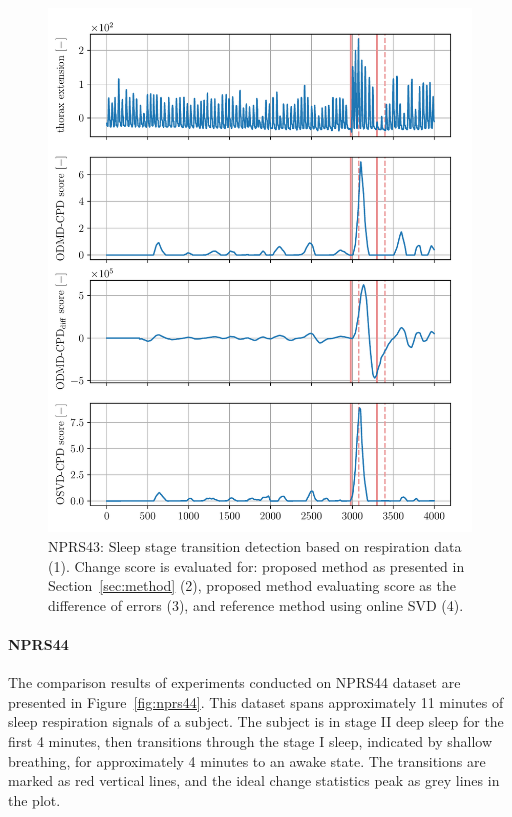 \begin{figure}
    \centering
    \includegraphics[width=\linewidth]{figures/nprs43-chd_r2-roll_301-dmd_w1.0-h80.pdf}
    \caption{NPRS43: Sleep stage transition detection based on respiration data (1). Change score is evaluated for: proposed method as presented in Section~\ref{sec:method} (2), proposed method evaluating score as the difference of errors (3), and reference method using online SVD (4).}\label{fig:nprs43}
\end{figure}

\paragraph{NPRS44}
The comparison results of experiments conducted on NPRS44 dataset are presented in Figure~\ref{fig:nprs44}. This dataset spans approximately 11 minutes of sleep respiration signals of a subject. The subject is in stage II deep sleep for the first 4 minutes, then transitions through the stage I sleep, indicated by shallow breathing, for approximately 4 minutes to an awake state. The transitions are marked as red vertical lines, and the ideal change statistics peak as grey lines in the plot.

